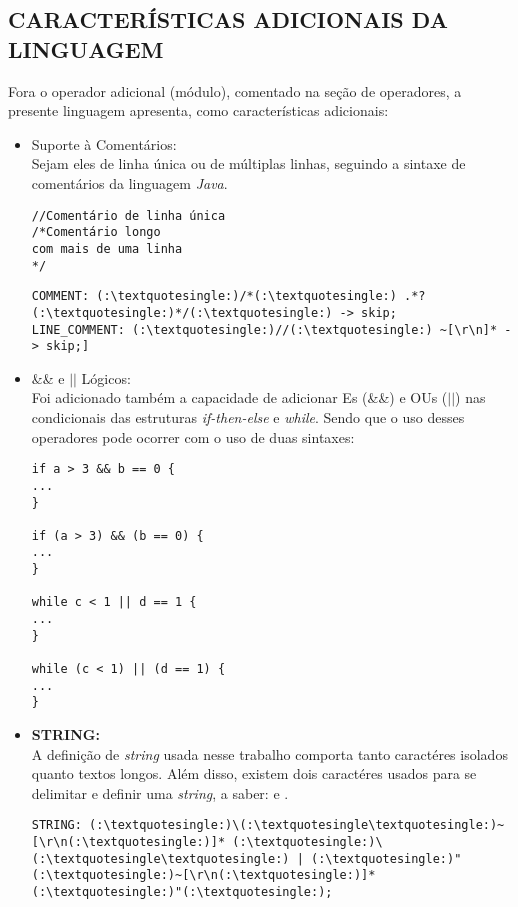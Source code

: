 \begin{itemize}
	\subsection{\normalsize CARACTERÍSTICAS ADICIONAIS DA LINGUAGEM}
            Fora o operador adicional (módulo), comentado na seção de operadores, a presente linguagem apresenta, como características adicionais:
			
			\begin{itemize}
				\item Suporte à Comentários:\\
					Sejam eles de linha única ou de múltiplas linhas, seguindo a sintaxe de comentários da linguagem \textit{Java}.
					\begin{lstlisting}
//Comentário de linha única
/*Comentário longo
com mais de uma linha
*/
					\end{lstlisting}

            \begin{lstlisting}
COMMENT: (:\textquotesingle:)/*(:\textquotesingle:) .*? (:\textquotesingle:)*/(:\textquotesingle:) -> skip;
LINE_COMMENT: (:\textquotesingle:)//(:\textquotesingle:) ~[\r\n]* -> skip;]
            \end{lstlisting}
            
            		\item \&\& e $||$ Lógicos:\\
            			Foi adicionado também a capacidade de adicionar Es (\&\&) e OUs ($||$) nas condicionais das estruturas \textit{if-then-else} e \textit{while}. Sendo que o uso desses operadores pode ocorrer com o uso de duas sintaxes:
            			\begin{lstlisting}
if a > 3 && b == 0 {
...
}

if (a > 3) && (b == 0) {
...
}

while c < 1 || d == 1 {
...
}

while (c < 1) || (d == 1) {
...
}
					\end{lstlisting}

                \item \textbf{STRING:}\\
                    A definição de \textit{string} usada nesse trabalho comporta tanto caractéres isolados quanto textos longos. Além disso, existem dois caractéres usados para se delimitar e definir uma \textit{string}, a saber: \textquotesingle \vspace{0.1cm} e \textquotedbl.

                    \begin{lstlisting}
STRING: (:\textquotesingle:)\(:\textquotesingle\textquotesingle:)~[\r\n(:\textquotesingle:)]* (:\textquotesingle:)\(:\textquotesingle\textquotesingle:) | (:\textquotesingle:)"(:\textquotesingle:)~[\r\n(:\textquotesingle:)]*(:\textquotesingle:)"(:\textquotesingle:);
                    \end{lstlisting}
            \end{itemize}
			\end{itemize}			            